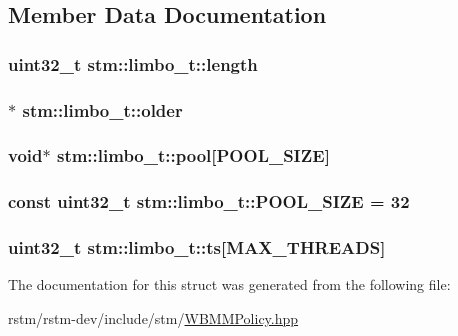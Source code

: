 \subsection{Member Data Documentation}
\hypertarget{structstm_1_1limbo__t_ab2c5d9c55b56444834b44cb76063a1e3}{
\subsubsection[{length}]{\setlength{\rightskip}{0pt plus 5cm}uint32\-\_\-t stm\-::limbo\-\_\-t\-::length}}\label{structstm_1_1limbo__t_ab2c5d9c55b56444834b44cb76063a1e3}
\hypertarget{structstm_1_1limbo__t_a77a04c6b5a6ca290eb745c4278ed0272}{
\subsubsection[{older}]{$\ast$ stm\-::limbo\-\_\-t\-::older}}\label{structstm_1_1limbo__t_a77a04c6b5a6ca290eb745c4278ed0272}
\hypertarget{structstm_1_1limbo__t_a2959f4e11ae87efa4f4f6a0109695872}{
\subsubsection[{pool}]{\setlength{\rightskip}{0pt plus 5cm}void$\ast$ stm\-::limbo\-\_\-t\-::pool\mbox{[}{\bf P\-O\-O\-L\-\_\-\-S\-I\-Z\-E}\mbox{]}}}\label{structstm_1_1limbo__t_a2959f4e11ae87efa4f4f6a0109695872}
\hypertarget{structstm_1_1limbo__t_a5f5c9d483ce76b1ca74b299e1717ba84}{
\subsubsection[{P\-O\-O\-L\-\_\-\-S\-I\-Z\-E}]{\setlength{\rightskip}{0pt plus 5cm}const uint32\-\_\-t stm\-::limbo\-\_\-t\-::\-P\-O\-O\-L\-\_\-\-S\-I\-Z\-E = 32\hspace{0.3cm}{\ttfamily [static]}}}\label{structstm_1_1limbo__t_a5f5c9d483ce76b1ca74b299e1717ba84}
\hypertarget{structstm_1_1limbo__t_af36c88026240d9d0a9940c759c18cc3a}{
\subsubsection[{ts}]{\setlength{\rightskip}{0pt plus 5cm}uint32\-\_\-t stm\-::limbo\-\_\-t\-::ts\mbox{[}{\bf M\-A\-X\-\_\-\-T\-H\-R\-E\-A\-D\-S}\mbox{]}}}\label{structstm_1_1limbo__t_af36c88026240d9d0a9940c759c18cc3a}


The documentation for this struct was generated from the following file\-:\begin{DoxyCompactItemize}
\item 
rstm/rstm-\/dev/include/stm/\hyperlink{WBMMPolicy_8hpp}{W\-B\-M\-M\-Policy.\-hpp}\end{DoxyCompactItemize}
